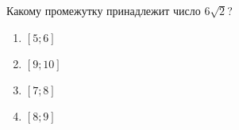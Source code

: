  \setanswer{}
\begin{ex}
	Какому промежутку принадлежит число $6\sqrt{2}$?
	
	\selectanswer
	\begin{multicols}{4}
		\begin{enumerate}[label=\arabic*)]
			\item $[5;6]$
			\item $[9;10]$
			\item $[7;8]$
			\item $[8;9]$
		\end{enumerate}
	\end{multicols}
\end{ex}
